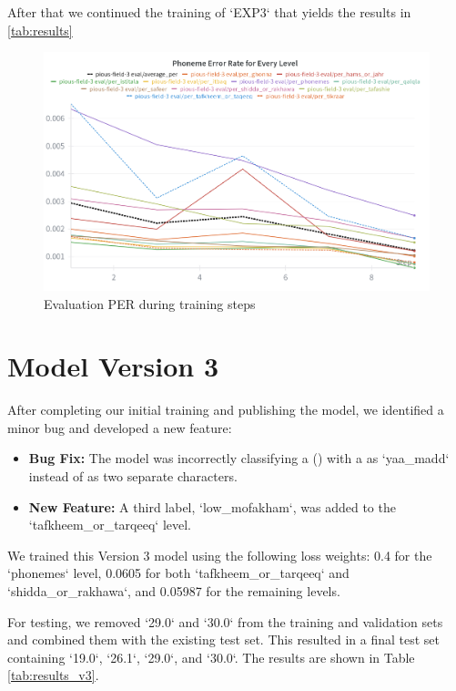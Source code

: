 After that we continued the training of `EXP3` that yields the results in \ref{tab:results}

\begin{figure}[H]
\centering
\includegraphics[width=\textwidth]{./figures/eval_v2_plot.png}
\caption{Evaluation PER during training steps}
\label{fig:eval_plot}
\end{figure}




\section{Model Version 3}

After completing our initial training and publishing the model, we identified a minor bug and developed a new feature:

\begin{itemize}
\item \textbf{Bug Fix:} The model was incorrectly classifying a  () with a  as `yaa_madd` instead of as two separate  characters.
\item \textbf{New Feature:} A third label, `low_mofakham`, was added to the `tafkheem_or_tarqeeq` level.
\end{itemize}

We trained this Version 3 model using the following loss weights: 0.4 for the `phonemes` level, 0.0605 for both `tafkheem_or_tarqeeq` and `shidda_or_rakhawa`, and 0.05987 for the remaining levels.

For testing, we removed  `29.0` and `30.0` from the training and validation sets and combined them with the existing test set. This resulted in a final test set containing  `19.0`, `26.1`, `29.0`, and `30.0`. The results are shown in Table \ref{tab:results_v3}.

